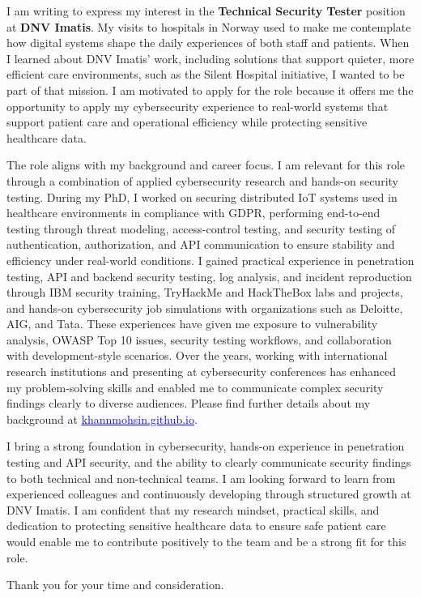 

I am writing to express my interest in the \textbf{Technical Security Tester} position at \textbf{DNV Imatis}.
%
My visits to hospitals in Norway used to make me contemplate how digital systems shape the daily experiences of both staff and patients. When I learned about DNV Imatis’ work, including solutions that support quieter, more efficient care environments, such as the Silent Hospital initiative, I wanted to be part of that mission. I am motivated to apply for the role because it offers me the opportunity to apply my cybersecurity experience to real-world systems that support patient care and operational efficiency while protecting sensitive healthcare data.

The role aligns with my background and career focus. I am relevant for this role through a combination of applied cybersecurity research and hands-on security testing. During my PhD, I worked on securing distributed IoT systems used in healthcare environments in compliance with GDPR, performing end-to-end testing through threat modeling, access-control testing, and security testing of authentication, authorization, and API communication to ensure stability and efficiency under real-world conditions. I gained practical experience in penetration testing, API and backend security testing, log analysis, and incident reproduction through IBM security training, TryHackMe and HackTheBox labs and projects, and hands-on cybersecurity job simulations with organizations such as Deloitte, AIG, and Tata.
These experiences have given me exposure to vulnerability analysis, OWASP Top 10 issues, security testing workflows, and collaboration with development-style scenarios. Over the years, working with international research institutions and presenting at cybersecurity conferences has enhanced my problem-solving skills and enabled me to communicate complex security findings clearly to diverse audiences.
Please find further details about my background at 
\href{https://khannmohsin.github.io/}{\textcolor{blue}{\underline{khannmohsin.github.io}}}.

I bring a strong foundation in cybersecurity, hands-on experience in penetration testing and API security, and the ability to clearly communicate security findings to both technical and non-technical teams. I am looking forward to learn from experienced colleagues and continuously developing through structured growth at DNV Imatis. I am confident that my research mindset, practical skills, and dedication to protecting sensitive healthcare data to ensure safe patient care would enable me to contribute positively to the team and be a strong fit for this role.

Thank you for your time and consideration. 
